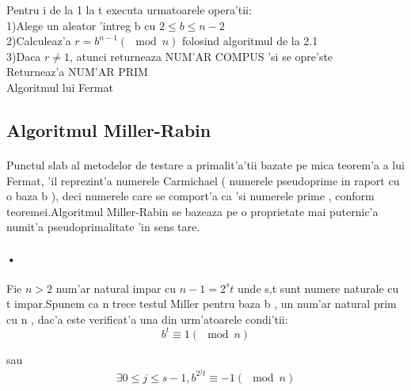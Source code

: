 \documentclass[12pt,twoside]{article}
\newcommand\tab[1][1cm]{\hspace*{#1}}
\numberwithin{figure}{section}
\begin{document}
\begin{algorithm}
 

Pentru i de la 1 la t executa urmatoarele opera'tii: \\
\tab 1)Alege un aleator 'intreg b cu  $2 \leq b \leq n-2$ \\
\tab 2)Calculeaz'a $r = b^{n-1} (\mod n)$ folosind algoritmul de la 2.1 \\
\tab 3)Daca $r \neq 1$, atunci returneaza NUM'AR COMPUS 'si se opre'ste \\


Returneaz'a NUM'AR PRIM \\
\caption{Algoritmul lui Fermat}
\end{algorithm}




\subsection{Algoritmul Miller-Rabin}
\paragraph{}
Punctul slab al metodelor de testare a primalit'a'tii bazate pe mica teorem'a a lui Fermat, 'il reprezint'a numerele Carmichael ( numerele pseudoprime in raport cu o baza b ), deci numerele care se comport'a ca 'si numerele prime , conform teoremei.Algoritmul Miller-Rabin se bazeaza pe o proprietate mai puternic'a numit'a pseudoprimalitate 'in sens tare. 
\paragraph{•}
Fie $n > 2$ num'ar natural impar cu $n-1 =  2^st $ unde s,t sunt numere naturale cu t impar.Spunem ca n trece testul Miller pentru baza b , un num'ar natural prim cu n , dac'a este verificat'a una din urm'atoarele condi'tii:
\begin{equation}
b^t \equiv 1 (\mod n)
\end{equation}

sau
\begin{equation}
\exists 0 \leq j \leq s-1 , b^{2^j t} \equiv -1( \mod n)
\end{equation}
\end{document}
